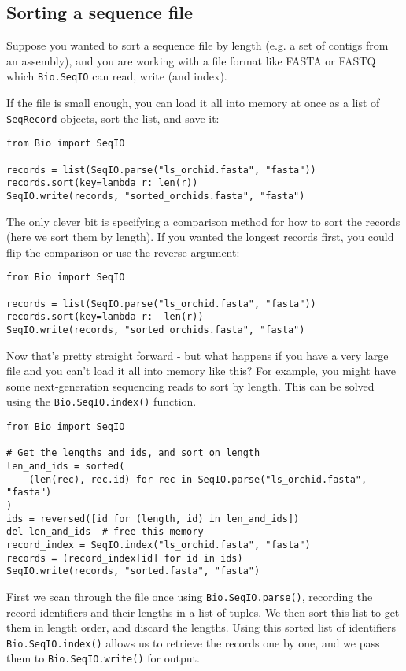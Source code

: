 \subsection{Sorting a sequence file}
\label{sec:SeqIO-sort}

Suppose you wanted to sort a sequence file by length (e.g. a set of
contigs from an assembly), and you are working with a file format like
FASTA or FASTQ which \verb|Bio.SeqIO| can read, write (and index).

If the file is small enough, you can load it all into memory at once
as a list of \verb|SeqRecord| objects, sort the list, and save it:

\begin{verbatim}
from Bio import SeqIO

records = list(SeqIO.parse("ls_orchid.fasta", "fasta"))
records.sort(key=lambda r: len(r))
SeqIO.write(records, "sorted_orchids.fasta", "fasta")
\end{verbatim}

The only clever bit is specifying a comparison method for how to
sort the records (here we sort them by length). If you wanted the
longest records first, you could flip the comparison or use the
reverse argument:

\begin{verbatim}
from Bio import SeqIO

records = list(SeqIO.parse("ls_orchid.fasta", "fasta"))
records.sort(key=lambda r: -len(r))
SeqIO.write(records, "sorted_orchids.fasta", "fasta")
\end{verbatim}

Now that's pretty straight forward - but what happens if you have a
very large file and you can't load it all into memory like this?
For example, you might have some next-generation sequencing reads
to sort by length. This can be solved using the
\verb|Bio.SeqIO.index()| function.

\begin{verbatim}
from Bio import SeqIO

# Get the lengths and ids, and sort on length
len_and_ids = sorted(
    (len(rec), rec.id) for rec in SeqIO.parse("ls_orchid.fasta", "fasta")
)
ids = reversed([id for (length, id) in len_and_ids])
del len_and_ids  # free this memory
record_index = SeqIO.index("ls_orchid.fasta", "fasta")
records = (record_index[id] for id in ids)
SeqIO.write(records, "sorted.fasta", "fasta")
\end{verbatim}

First we scan through the file once using \verb|Bio.SeqIO.parse()|,
recording the record identifiers and their lengths in a list of tuples.
We then sort this list to get them in length order, and discard the lengths.
Using this sorted list of identifiers \verb|Bio.SeqIO.index()| allows us to
retrieve the records one by one, and we pass them to \verb|Bio.SeqIO.write()|
for output.

